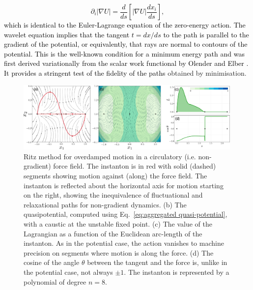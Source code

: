 \textcolor{black}{
\[
\partial_{i}|\nabla U|=\frac{d}{ds}\left[|\nabla U|\frac{dx_{i}}{ds}\right],
\]
which is identical to the Euler-Lagrange equation of the zero-energy
action. The wavelet equation implies that the tangent $t=dx/ds$ to
the path is parallel to the gradient of the potential, or equivalently,
that rays are normal to contours of the potential. This is the well-known
condition for a minimum energy path and was first derived variationally
from the scalar work functional by Olender and Elber \citep{olender1997yet}.
It provides a stringent test of the fidelity of the paths }obtained
by minimisation. 
\begin{figure}
\begin{centering}
\includegraphics[width=0.99\textwidth]{figs_part1/pyritz/fig2.jpeg}
\par\end{centering}
\caption{Ritz method for overdamped motion in a circulatory (i.e. non-gradient)
force field. The instanton is in red with solid (dashed) segments
showing motion against (along) the force field. The instanton is reflected
about the horizontal axis for motion starting on the right, showing
the inequivalence of fluctuational and relaxational paths for non-gradient
dynamics. (b) The quasipotential, computed using Eq.~\ref{eq:aggregated quasi-potential},
with a caustic at the unstable fixed point. (c) The value of the Lagrangian
as a function of the Euclidean arc-length of the instanton. As in
the potential case, the action vanishes to machine precision on segments
where motion is along the force. (d) The cosine of the angle $\theta$
between the tangent and the force is, unlike in the potential case,
not always $\pm1$. The instanton is represented by a polynomial of
degree $n=8.$ }

\label{fig:maier-stein-quasipotentials}
\end{figure}


